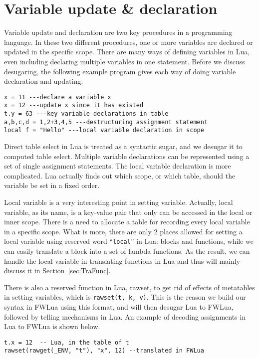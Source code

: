 \section{Variable update \& declaration}\label{sec:desugarVarUpdate}
Variable update and declaration are two key procedures in a programming language. 
In these two different procedures, one or more variables are declared or updated in the specific scope. There are many ways of defining variables in Lua, even including declaring multiple variables in one statement. Before we discuss desugaring, the following example program gives each way of doing variable declaration and updating.

\begin{verbatim}
x = 11 ---declare a variable x
x = 12 ---update x since it has existed
t.y = 63 ---key variable declarations in table
a,b,c,d = 1,2+3,4,5 ---destructuring assignment statement
local f = "Hello" ---local variable declaration in scope
\end{verbatim}

Direct table select in Lua is treated as a syntactic sugar, and we desugar it to computed table select. 
Multiple variable declarations can be represented using a set of single assignment statements. 
The local variable declaration is more complicated. Lua actually finds out which scope, or which table, should the variable be set in a fixed order. 

Local variable is a very interesting point in setting variable. Actually, local variable, as its name, is a key-value pair that only can be accessed in the local or inner scope. There is a need to allocate a table for recording every local variable in a specific scope. What is more, there are only 2 places allowed for setting a local variable using reserved word ``{\tt local}'' in Lua: blocks and functions,  while we can easily translate a block into a set of lambda functions. As the result, we can handle the local variable in translating functions in Lua and thus will mainly discuss it in Section~\ref{sec:TraFunc}. 

There is also a reserved function in Lua, rawset, to get rid of effects of metatables in setting variables, which is {\tt rawset(t, k, v)}. This is the reason we build our syntax in FWLua using this format, and will then desugar Lua to FWLua, followed by telling mechanisms in Lua.
An example of decoding assignments in Lua to FWLua is shown below.

\begin{verbatim}
t.x = 12  -- Lua, in the table of t
rawset(rawget(_ENV, "t"), "x", 12) --translated in FWLua
\end{verbatim}

